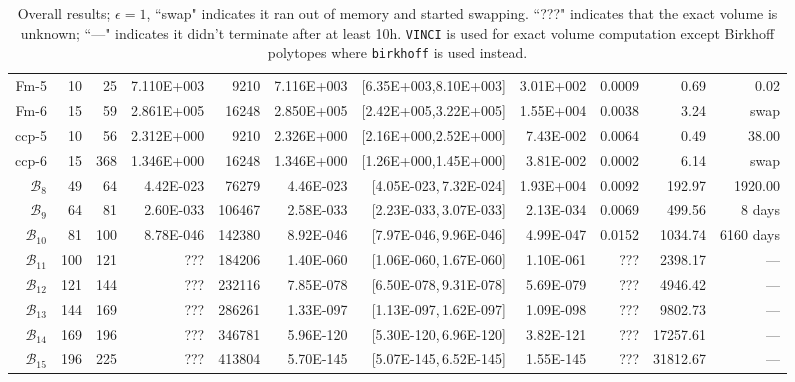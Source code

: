 \documentclass[11pt,a4paper]{article}
\def\B{{\mathcal B}} \def\E{{\mathcal E}}
\begin{document}
\begin{table}[t!]
\begin{tabular*}{\linewidth}{@{\extracolsep{\fill}}r@{\quad}r@{\quad}r@{\quad}r
@{\quad}r@{\quad}r@{\quad}r@{\quad}r@{~}r@{\quad}r@{\quad}r}
Fm-5 & 10 & 25 & 7.110E+003 & 9210 & 7.116E+003 & [6.35E+003,8.10E+003] & 3.01E+002 & 0.0009 & 0.69 & 0.02\\
Fm-6 & 15 & 59 & 2.861E+005 & 16248 & 2.850E+005 & [2.42E+005,3.22E+005] & 1.55E+004 & 0.0038 & 3.24 & swap\\
ccp-5 & 10 & 56 & 2.312E+000 & 9210 & 2.326E+000 & [2.16E+000,2.52E+000] & 7.43E-002 & 0.0064 & 0.49 & 38.00\\
ccp-6 & 15 & 368 & 1.346E+000 & 16248 & 1.346E+000 & [1.26E+000,1.45E+000] & 3.81E-002 & 0.0002 & 6.14 & swap\\
$\B_{8}$ & 49 & 64 & 4.42E-023 & 76279 & 4.46E-023 & [4.05E-023,\,7.32E-024] & 1.93E+004 & 0.0092 & 192.97 & 1920.00\\ 
$\B_{9}$ & 64 & 81 &  2.60E-033 & 106467 & 2.58E-033 & [2.23E-033,\,3.07E-033] & 2.13E-034 & 0.0069 & 499.56 & 8 days\\
$\B_{10}$ & 81 & 100 & 8.78E-046 & 142380 & 8.92E-046 & [7.97E-046,\,9.96E-046] & 4.99E-047 & 0.0152 & 1034.74 & 6160 days\\
$\B_{11}$ & 100 & 121 & ??? & 184206 & 1.40E-060 & [1.06E-060,\,1.67E-060] & 1.10E-061 & ??? & 2398.17 & ---\\
$\B_{12}$ & 121 & 144 & ??? & 232116 &  7.85E-078 & [6.50E-078,\,9.31E-078] & 5.69E-079 & ??? & 4946.42 & ---\\
$\B_{13}$ & 144 & 169 & ??? & 286261 &  1.33E-097 & [1.13E-097,\,1.62E-097] & 1.09E-098 & ??? & 9802.73 & ---\\
$\B_{14}$ & 169 & 196 & ??? & 346781 &  5.96E-120 & [5.30E-120,\,6.96E-120] & 3.82E-121 & ??? & 17257.61 & ---\\
$\B_{15}$ & 196 & 225 & ??? & 413804 &  5.70E-145 & [5.07E-145,\,6.52E-145] & 1.55E-145 & ??? & 31812.67 & ---\\
\end{tabular*}
\caption{ Overall results; 
$\epsilon=1$, ``swap" indicates it ran out of memory and started
swapping. ``???" indicates that the exact volume is unknown; ``---" indicates it didn't terminate after at least 10h. {\tt VINCI} is used for exact volume computation except Birkhoff polytopes where {\tt birkhoff} is used instead.\label{table:vol_results}}
\end{table}
\end{document}
